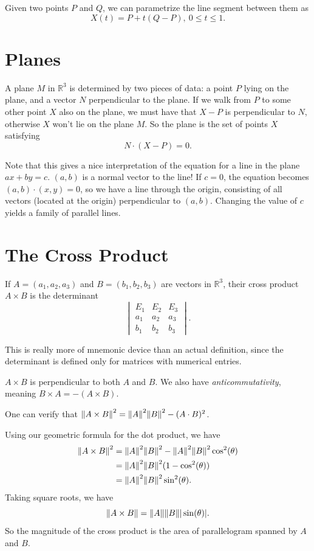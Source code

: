 \documentclass{article}
\begin{document}
Given two points $P$ and $Q$, we can parametrize the line segment 
between them as 
\[X(t) = P + t(Q-P),\ 0 \leq t \leq 1.\]

\section*{Planes}

A plane $M$ in $\mathbb{R}^3$ is determined by two pieces of data: 
a point $P$ lying on the plane, and a vector $N$ perpendicular
to the plane. If we walk from $P$ to some other point $X$ also on the plane,
we must have that $X-P$ is perpendicular to $N$, otherwise $X$ won't lie
on the plane $M$. So the plane is the set of points $X$ satisfying
\[N \cdot (X-P) = 0.\]

Note that this gives a nice interpretation of the equation for a line
in the plane $ax+by=c$. $(a,b)$ is a normal vector to the line!
If $c=0$, the equation becomes $(a,b)\cdot (x,y) = 0$, so we have
a line through the origin, consisting of all vectors (located at the origin)
perpendicular to $(a,b)$. Changing the value of $c$ yields a family
of parallel lines.

\section*{The Cross Product}

If $A=(a_1,a_2,a_3)$ and $B=(b_1,b_2,b_3)$ are vectors in $\mathbb{R}^3$,
their cross product $A \times B$ is the determinant
\[ \begin{vmatrix}
    E_1 & E_2 & E_3\\
    a_1 & a_2 & a_3\\
    b_1 & b_2 & b_3
    \end{vmatrix} .\]

This is really more of mnemonic device than an actual definition, since
the determinant is defined only for matrices with numerical entries. 

$A \times B$ is perpendicular to both $A$ and $B$. We also have 
\emph{anticommutativity}, meaning $B \times A = -(A \times B)$.

One can verify that $\norm{A \times B}^2 = \norm{A}^2 \norm{B}^2 - (A \cdot B)^2$.

Using our geometric formula for the dot product, we have
\begin{align*}
    \norm{A \times B}^2 &= \norm{A}^2 \norm{B}^2 - \norm{A}^2 \norm{B}^2 \cos^2(\theta)\\
    &= \norm{A}^2 \norm{B}^2 (1 - \cos^2(\theta))\\
    &= \norm{A}^2 \norm{B}^2 \sin^2(\theta).
\end{align*}
Taking square roots, we have
\[\norm{A\times B} = \norm{A} \norm{B} |\sin(\theta)|. \]
So the magnitude of the cross product is the area of parallelogram
spanned by $A$ and $B$.

\end{document}
